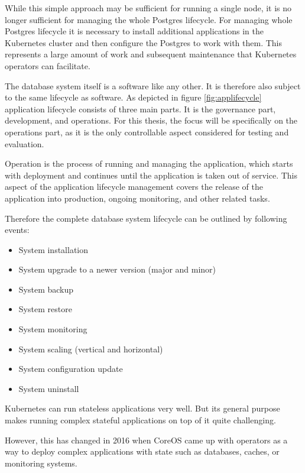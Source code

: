 While this simple approach may be sufficient for running a single node, it is no longer sufficient for managing the whole Postgres lifecycle.
For managing whole Postgres lifecycle it is necessary to install additional applications in the Kubernetes cluster and then configure the Postgres to work with them. This represents a large amount of work and subsequent maintenance that Kubernetes operators can facilitate.

\label{chap:lifecycle}
The database system itself is a software like any other. It is therefore also subject to the same lifecycle as software.
As depicted in figure \ref{fig:applifecycle} application lifecycle consists of three main parts. It is the governance part, development, and operations.
For this thesis, the focus will be specifically on the operations part, as it is the only controllable aspect considered for testing and evaluation.

Operation is the process of running and managing the application, which starts with deployment and continues until the application is taken out of service. This aspect of the application lifecycle management covers the release of the application into production, ongoing monitoring, and other related tasks. \cite{ALM}

Therefore the complete database system lifecycle can be outlined by following events:
\begin{itemize}
    \item System installation
    \item System upgrade to a newer version (major and minor)
    \item System backup
    \item System restore
    \item System monitoring
    \item System scaling (vertical and horizontal)
    \item System configuration update
    \item System uninstall
\end{itemize}

\pagebreak
{}
\label{chap:operators}
Kubernetes can run stateless applications very well. But its general purpose makes running complex stateful applications on top of it quite challenging.

However, this has changed in 2016 when CoreOS came up with operators as a way to deploy complex applications with state such as databases, caches, or monitoring systems. \cite{IArchiveCOSoperators}

